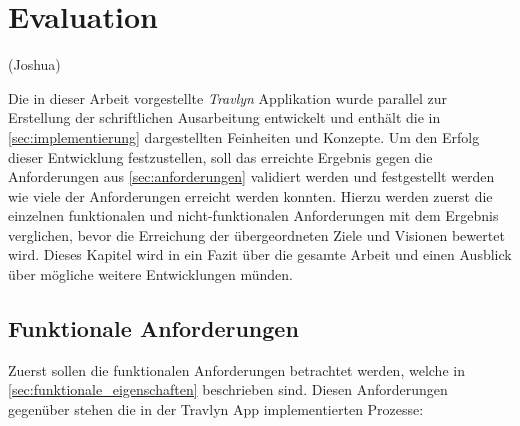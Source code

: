 \chapter{Evaluation}

(Joshua)

Die in dieser Arbeit vorgestellte \textit{Travlyn} Applikation wurde parallel zur Erstellung der schriftlichen Ausarbeitung entwickelt und enthält die in \autoref{sec:implementierung} dargestellten Feinheiten und Konzepte. Um den Erfolg dieser Entwicklung festzustellen, soll das erreichte Ergebnis gegen die Anforderungen aus \autoref{sec:anforderungen} validiert werden und festgestellt werden wie viele der Anforderungen erreicht werden konnten. Hierzu werden zuerst die einzelnen funktionalen und nicht-funktionalen Anforderungen mit dem Ergebnis verglichen, bevor die Erreichung der übergeordneten Ziele und Visionen bewertet wird. Dieses Kapitel wird in ein Fazit über die gesamte Arbeit und einen Ausblick über mögliche weitere Entwicklungen münden.

\section{Funktionale Anforderungen}\label{sec:funktional_evaluation}
Zuerst sollen die funktionalen Anforderungen betrachtet werden, welche in \autoref{sec:funktionale_eigenschaften} beschrieben sind. Diesen Anforderungen gegenüber stehen die in der Travlyn App implementierten Prozesse:

